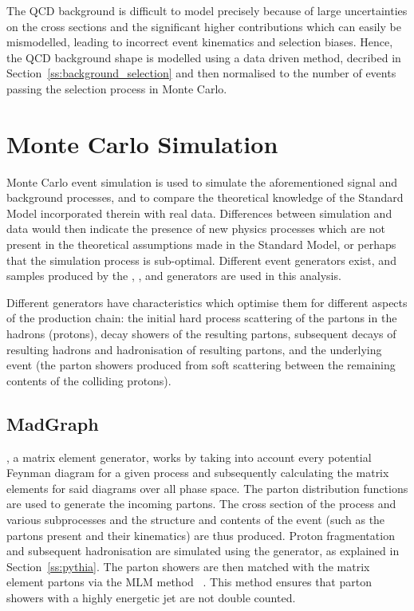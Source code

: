 The QCD background is difficult to model precisely because of large uncertainties on the cross sections and
the significant higher contributions which can easily be mismodelled, leading to incorrect event kinematics
and selection biases. Hence, the QCD background shape is modelled using a data driven method, decribed in
Section~\ref{ss:background_selection} and then normalised to the number of events passing the selection
process in Monte Carlo.

\section{Monte Carlo Simulation}
\label{s:monte_carlo_simulation}

Monte Carlo event simulation is used to simulate the aforementioned signal and background processes, and to
compare the theoretical knowledge of the Standard Model incorporated therein with real data. Differences
between simulation and data would then indicate the presence of new physics processes which are not present in
the theoretical assumptions made in the Standard Model, or perhaps that the simulation process is sub-optimal.
Different event generators exist, and samples produced by the \MADGRAPH, \PYTHIA, \POWHEG and \HERWIG
generators are used in this analysis.

Different generators have characteristics which optimise them for different aspects of the production chain:
the initial hard process scattering of the partons in the hadrons (protons), decay showers of the resulting
partons, subsequent decays of resulting hadrons and hadronisation of resulting partons, and the underlying
event (the parton showers produced from soft scattering between the remaining contents of the colliding
protons). 

\subsection{MadGraph}
\label{ss:madgraph}
\MADGRAPH \cite{madgraph5}, a matrix element generator, works by taking into account every potential Feynman
diagram for a given process and subsequently calculating the matrix elements for said diagrams over all phase
space. The parton distribution functions are used to generate the incoming partons. The cross section of the
process and various subprocesses and the structure and contents of the event (such as the partons present and
their kinematics) are thus produced. %
Proton fragmentation and subsequent hadronisation are simulated using the \PYTHIA generator, as explained in
Section~\ref{ss:pythia}. The parton showers are then matched with the matrix element partons via the MLM
method ~\cite{mlm}. This method ensures that parton showers with a highly energetic jet are not double
counted.

